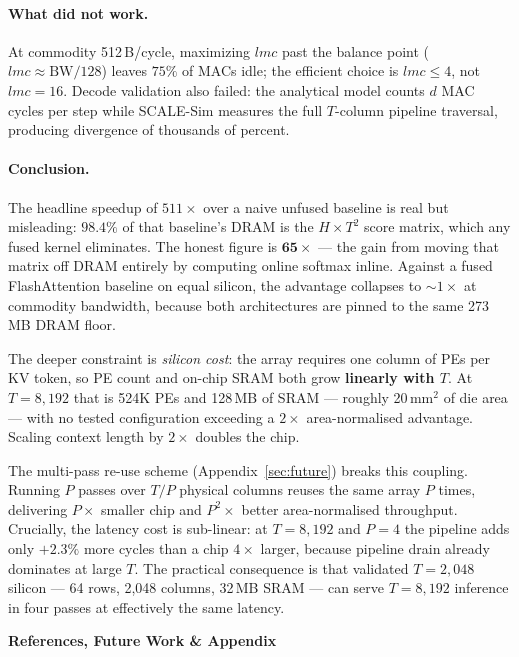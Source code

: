 \documentclass[11pt]{article}
\begin{document}
\paragraph{What did not work.}
At commodity 512\,B/cycle, maximizing $lmc$ past the balance point
($lmc{\approx}\text{BW}/128$) leaves $75\%$ of MACs idle; the efficient choice
is $lmc{\le}4$, not $lmc{=}16$.
Decode validation also failed: the analytical model counts $d$ MAC cycles per
step while SCALE-Sim measures the full $T$-column pipeline traversal, producing
divergence of thousands of percent.

\paragraph{Conclusion.}
The headline speedup of $511\times$ over a naive unfused baseline is real but
misleading: $98.4\%$ of that baseline's DRAM is the $H{\times}T^2$ score matrix,
which any fused kernel eliminates.
The honest figure is $\mathbf{65\times}$ --- the gain from moving that matrix
off DRAM entirely by computing online softmax inline.
Against a fused FlashAttention baseline on equal silicon, the advantage collapses
to ${\sim}1\times$ at commodity bandwidth, because both architectures are pinned
to the same 273\,MB DRAM floor.

The deeper constraint is \emph{silicon cost}: the array requires one column of
PEs per KV token, so PE count and on-chip SRAM both grow \textbf{linearly with
$T$}.
At $T{=}8{,}192$ that is 524K PEs and 128\,MB of SRAM --- roughly 20\,mm$^2$ of
die area --- with no tested configuration exceeding a $2\times$ area-normalised
advantage.
Scaling context length by $2\times$ doubles the chip.

The multi-pass re-use scheme (Appendix~\ref{sec:future}) breaks this coupling.
Running $P$ passes over $T/P$ physical columns reuses the same array $P$ times,
delivering $P\times$ smaller chip and $P^2\times$ better area-normalised
throughput.
Crucially, the latency cost is sub-linear: at $T{=}8{,}192$ and $P{=}4$ the
pipeline adds only $+2.3\%$ more cycles than a chip $4\times$ larger, because
pipeline drain already dominates at large $T$.
The practical consequence is that validated $T{=}2{,}048$ silicon --- 64 rows,
2{,}048 columns, 32\,MB SRAM --- can serve $T{=}8{,}192$ inference in four
passes at effectively the same latency.

\clearpage

{\centering\Large\textbf{References, Future Work \& Appendix}\par}
\vspace{1.5em}
\end{document}
